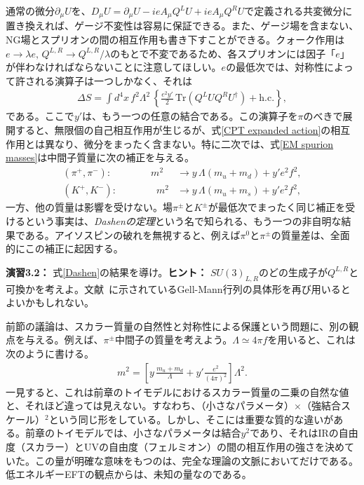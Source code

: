通常の微分$\partial_\mu U$を、$D_\mu U = \partial_\mu U - i e A_\mu Q^L U + i e  A_\mu Q^R U$で定義される共変微分に置き換えれば、ゲージ不変性は容易に保証できる。また、ゲージ場を含まない、NG場とスプリオンの間の相互作用も書き下すことができる。クォーク作用は$e \to \lambda e, \, Q^{L,R} \to Q^{L,R} / \lambda$のもとで不変であるため、各スプリオンには因子「$e$」が伴わなければならないことに注意してほしい。$e$の最低次では、対称性によって許される演算子は一つしかなく、それは
%
\begin{align} \label{EM spurion masses}
	\Delta S = \int d^4 x \, f^2 \Lambda^2 \, \left\{ \frac{e^2 y'}{2} \, \mbox{Tr} \left( Q^L U Q^R U^\dag \right) + \mbox{h.c.}  \right\} , 
\end{align}
%
である。ここで$y'$は、もう一つの任意の結合である。この演算子を$\pi$のべきで展開すると、無限個の自己相互作用が生じるが、式\eqref{CPT expanded action}の相互作用とは異なり、微分をまったく含まない。特に二次では、式\eqref{EM spurion masses}は中間子質量に次の補正を与える。
%
\begin{align} \label{Dashen}
	(\pi^+, \pi^-): \qquad \qquad  m^2 &\to y \, \Lambda (m_u+m_d) +  y' e^2 f^2, \\
    (K^+, K^-): \qquad \qquad m^2  &\to y \, \Lambda (m_u+m_s) +  y' e^2 f^2 ,
\end{align}
%
一方、他の質量は影響を受けない。場$\pi^\pm$と$K^\pm$が最低次でまったく同じ補正を受けるという事実は、\emph{Dashenの定理}という名で知られる、もう一つの非自明な結果である。アイソスピンの破れを無視すると、例えば$\pi^0$と$\pi^\pm$の質量差は、全面的にこの補正に起因する。


%
\begin{eBox}
%
{\bf 演習3.2：} 式\eqref{Dashen}の結果を導け。{\bf ヒント：} $SU(3)_{L,R}$のどの生成子が$Q^{L,R}$と可換かを考えよ。文献~\cite{Scherer:2002tk}に示されているGell-Mann行列の具体形を再び用いるとよいかもしれない。
%
\end{eBox}
%




前節の議論は、スカラー質量の自然性と対称性による保護という問題に、別の観点を与える。例えば、$\pi^\pm$中間子の質量を考えよう。$\Lambda \simeq 4 \pi f$を用いると、これは次のように書ける。
%
\begin{align} \label{naturalness mass PNGB}
	m^2 = \left[ y \, \frac{m_u +m_d}{\Lambda} + y' \frac{e^2}{(4\pi)^2} \right] \Lambda^2 .
\end{align}
%
一見すると、これは前章のトイモデルにおけるスカラー質量の二乗の自然な値と、それほど違っては見えない。すなわち、（小さなパラメータ）$\times$（強結合スケール）$^2$という同じ形をしている。しかし、そこには重要な質的な違いがある。前章のトイモデルでは、小さなパラメータは結合$y^2$であり、それはIRの自由度（スカラー）とUVの自由度（フェルミオン）の間の相互作用の強さを決めていた。この量が明確な意味をもつのは、完全な理論の文脈においてだけである。低エネルギーEFTの観点からは、未知の量なのである。

